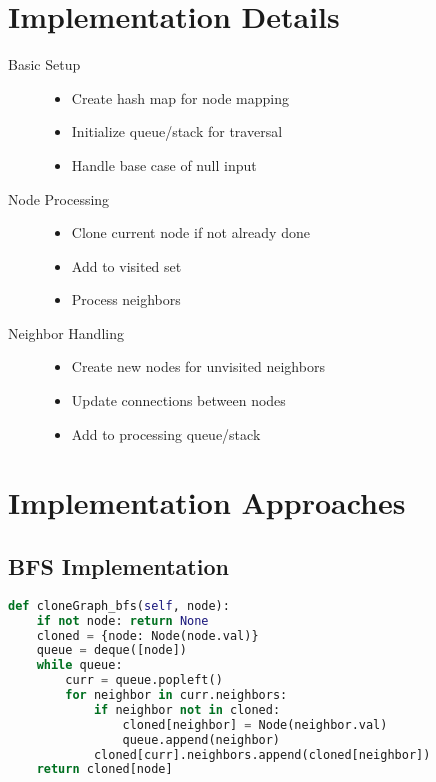 \section*{Implementation Details}
\begin{description}
    \item[Basic Setup]
    \begin{itemize}
        \item Create hash map for node mapping
        \item Initialize queue/stack for traversal
        \item Handle base case of null input
    \end{itemize}

    \item[Node Processing]
    \begin{itemize}
        \item Clone current node if not already done
        \item Add to visited set
        \item Process neighbors
    \end{itemize}

    \item[Neighbor Handling]
    \begin{itemize}
        \item Create new nodes for unvisited neighbors
        \item Update connections between nodes
        \item Add to processing queue/stack
    \end{itemize}
\end{description}

\section*{Implementation Approaches}

\subsection*{BFS Implementation}
\begin{lstlisting}[language=Python]
def cloneGraph_bfs(self, node):
    if not node: return None
    cloned = {node: Node(node.val)}
    queue = deque([node])
    while queue:
        curr = queue.popleft()
        for neighbor in curr.neighbors:
            if neighbor not in cloned:
                cloned[neighbor] = Node(neighbor.val)
                queue.append(neighbor)
            cloned[curr].neighbors.append(cloned[neighbor])
    return cloned[node]
\end{lstlisting}

